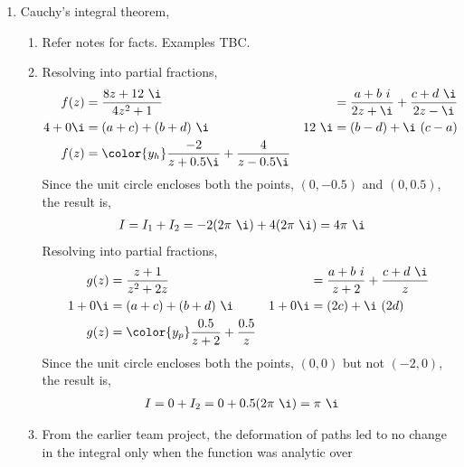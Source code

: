 \begin{enumerate}
    \item Cauchy's integral theorem,
          \begin{enumerate}
              \item Refer notes for facts. Examples TBC.
              \item Resolving into partial fractions,
                    \begin{align}
                        f(z)    & = \frac{8z + 12\ \i}{4z^2 + 1}     &
                                & = \frac{a + b\ i}{2z + \i}
                        + \frac{c + d\ \i}{2z - \i}                    \\
                        4 + 0\i & = (a + c) + (b + d)\ \i            &
                        12\ \i  & = (b - d) + \i\ (c - a)              \\
                        f(z)    & = \color{y_h} \frac{-2}{z + 0.5\i}
                        + \frac{4}{z - 0.5\i}
                    \end{align}
                    Since the unit circle encloses both the points, $ (0, -0.5) $ and
                    $ (0, 0.5) $, the result is,
                    \begin{align}
                        I & = I_1 + I_2 = -2 (2\pi\ \i) + 4(2\pi\ \i) = 4\pi\ \i
                    \end{align}
                    Resolving into partial fractions,
                    \begin{align}
                        g(z)    & = \frac{z + 1}{z^2 + 2z}        &
                                & = \frac{a + b\ i}{z + 2}
                        + \frac{c + d\ \i}{z}                       \\
                        1 + 0\i & = (a + c) + (b + d)\ \i         &
                        1 + 0\i & = (2c) + \i\ (2d)                 \\
                        g(z)    & = \color{y_p} \frac{0.5}{z + 2}
                        + \frac{0.5}{z}
                    \end{align}
                    Since the unit circle encloses both the points, $ (0, 0) $ but not
                    $ (-2, 0) $, the result is,
                    \begin{align}
                        I & = 0 + I_2 = 0 + 0.5(2\pi\ \i) = \pi\ \i
                    \end{align}
              \item From the earlier team project, the deformation of paths led
                    to no change in the integral only when the function was analytic over

\end{enumerate}
\end{enumerate}
